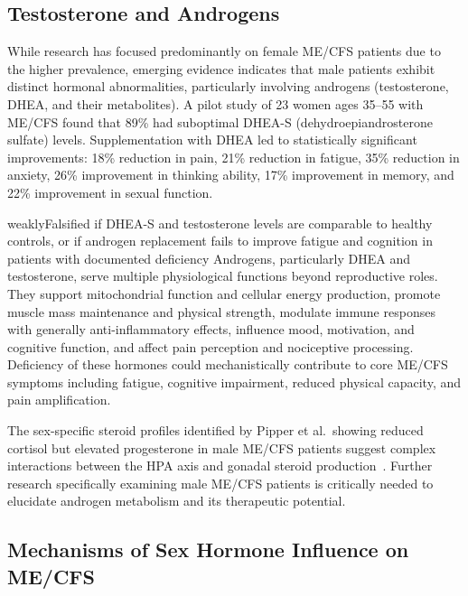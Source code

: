 \subsection{Testosterone and Androgens}

While research has focused predominantly on female ME/CFS patients due to the higher prevalence, emerging evidence indicates that male patients exhibit distinct hormonal abnormalities, particularly involving androgens (testosterone, DHEA, and their metabolites). A pilot study of 23 women ages 35--55 with ME/CFS found that 89\% had suboptimal DHEA-S (dehydroepiandrosterone sulfate) levels. Supplementation with DHEA led to statistically significant improvements: 18\% reduction in pain, 21\% reduction in fatigue, 35\% reduction in anxiety, 26\% improvement in thinking ability, 17\% improvement in memory, and 22\% improvement in sexual function.

\begin{fhypothesis}{weakly}{Falsified if DHEA-S and testosterone levels are comparable to healthy controls, or if androgen replacement fails to improve fatigue and cognition in patients with documented deficiency}
\label{hyp:androgen-deficiency}
Androgens, particularly DHEA and testosterone, serve multiple physiological functions beyond reproductive roles. They support mitochondrial function and cellular energy production, promote muscle mass maintenance and physical strength, modulate immune responses with generally anti-inflammatory effects, influence mood, motivation, and cognitive function, and affect pain perception and nociceptive processing. Deficiency of these hormones could mechanistically contribute to core ME/CFS symptoms including fatigue, cognitive impairment, reduced physical capacity, and pain amplification.
\end{fhypothesis}

The sex-specific steroid profiles identified by Pipper et al.\ showing reduced cortisol but elevated progesterone in male ME/CFS patients suggest complex interactions between the HPA axis and gonadal steroid production~\cite{pipper2024steroid}. Further research specifically examining male ME/CFS patients is critically needed to elucidate androgen metabolism and its therapeutic potential.

\subsection{Mechanisms of Sex Hormone Influence on ME/CFS}

